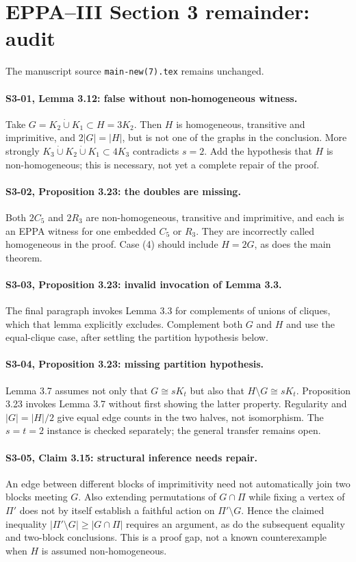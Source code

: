 \documentclass{article}
\begin{document}
\section*{EPPA--III Section 3 remainder: audit}
The manuscript source \texttt{main-new(7).tex} remains unchanged.
\paragraph{S3-01, Lemma 3.12: false without non-homogeneous witness.}
Take \(G=K_2\dot\cup K_1\subset H=3K_2\). Then \(H\) is homogeneous,
transitive and imprimitive, and \(2|G|=|H|\), but is not one of
the graphs in the conclusion. More strongly
\(K_3\dot\cup K_2\dot\cup K_1\subset 4K_3\) contradicts \(s=2\).
Add the hypothesis that \(H\) is non-homogeneous; this is necessary,
not yet a complete repair of the proof.
\paragraph{S3-02, Proposition 3.23: the doubles are missing.}
Both \(2C_5\) and \(2R_3\) are non-homogeneous, transitive and imprimitive,
and each is an EPPA witness for one embedded \(C_5\) or \(R_3\).
They are incorrectly called homogeneous in the proof.
Case (4) should include \(H=2G\), as does the main theorem.
\paragraph{S3-03, Proposition 3.23: invalid invocation of Lemma 3.3.}
The final paragraph invokes Lemma 3.3 for complements of
unions of cliques, which that lemma explicitly excludes.
Complement both \(G\) and \(H\) and use the equal-clique
case, after settling the partition hypothesis below.
\paragraph{S3-04, Proposition 3.23: missing partition hypothesis.}
Lemma 3.7 assumes not only that \(G\cong sK_t\) but also that
\(H\setminus G\cong sK_t\). Proposition 3.23 invokes Lemma 3.7
without first showing the latter property. Regularity and
\(|G|=|H|/2\) give equal edge counts in the two halves,
not isomorphism. The \(s=t=2\) instance is checked separately;
the general transfer remains open.
\paragraph{S3-05, Claim 3.15: structural inference needs repair.}
An edge between different blocks of imprimitivity need not
automatically join two blocks meeting \(G\). Also extending
permutations of \(G\cap\Pi\) while fixing a vertex of \(\Pi'\)
does not by itself establish a faithful action on
\(\Pi'\setminus G\). Hence the claimed inequality
\(|\Pi'\setminus G|\geq |G\cap\Pi|\) requires an argument,
as do the subsequent equality and two-block conclusions.
This is a proof gap, not a known counterexample when \(H\)
is assumed non-homogeneous.
\end{document}
